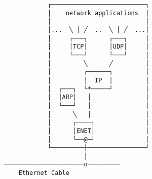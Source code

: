 \documentclass[varwidth,crop]{standalone}
\begin{document}
\begin{verbatim}
            ┌──────────────────────────┐
            │    network applications  │
            │                          │
            │...  ╲ │ ╱  ..  ╲ │ ╱  ...│
            │     ┌───┐      ┌───┐     │
            │     │TCP│      │UDP│     │
            │     └───┘      └───┘     │
            │         ╲      ╱         │
            │         ┌──────┐         │
            │         │  IP  │         │
            │  ┌───┐  └*─────┘         │
            │  │ARP│   │               │
            │  └───┘   │               │
            │      ╲   │               │
            │      ┌────┐              │
            │      │ENET│              │
            │      └──@─┘              │
            └─────────┼────────────────┘
                      │
──────────────────────o─────────
    Ethernet Cable
\end{verbatim}
\end{document}
